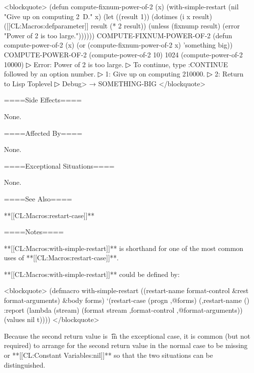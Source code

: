 <blockquote> (defun compute-fixnum-power-of-2 (x) (with-simple-restart (nil "Give up on computing 2{\hat}~D." x) (let ((result 1)) (dotimes (i x result) ([[CL:Macros:defparameter]] result (* 2 result)) (unless (fixnump result) (error "Power of 2 is too large.")))))) COMPUTE-FIXNUM-POWER-OF-2 (defun compute-power-of-2 (x) (or (compute-fixnum-power-of-2 x) 'something big)) COMPUTE-POWER-OF-2 (compute-power-of-2 10) 1024 (compute-power-of-2 10000)
▷ Error: Power of 2 is too large.
▷ To continue, type :CONTINUE followed by an option number.
▷ 1: Give up on computing 2{\hat}10000.
▷ 2: Return to Lisp Toplevel
▷ Debug>  → SOMETHING-BIG </blockquote>

====Side Effects====

None.

====Affected By====

None.

====Exceptional Situations====

None.

====See Also====

**[[CL:Macros:restart-case]]**

====Notes====

**[[CL:Macros:with-simple-restart]]** is shorthand for one of the most common uses of **[[CL:Macros:restart-case]]**.

**[[CL:Macros:with-simple-restart]]** could be defined by:

<blockquote> (defmacro with-simple-restart ((restart-name format-control &rest format-arguments) &body forms) `(restart-case (progn ,@forms) (,restart-name () :report (lambda (stream) (format stream ,format-control ,@format-arguments)) (values nil t)))) </blockquote>

Because the second return value is \t\ in the exceptional case, it is common (but not required) to arrange for the second return value in the normal case to be missing or **[[CL:Constant Variables:nil]]** so that the two situations can be distinguished.

 
